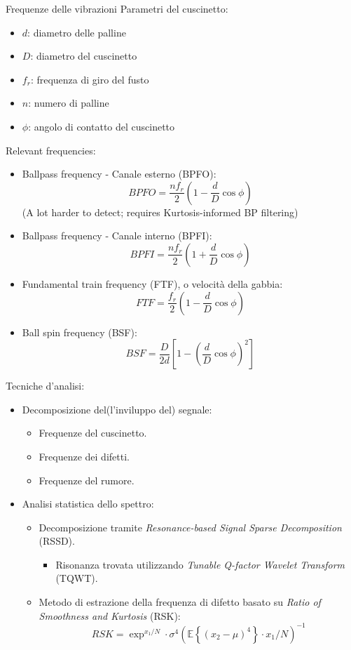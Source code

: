 \documentclass{beamer}
\begin{document}
\begin{frame}[allowframebreaks]{Frequenze delle vibrazioni}
    Parametri del cuscinetto:
    \begin{itemize}
        \item $d$: diametro delle palline
        \item $D$: diametro del cuscinetto
        \item $f_r$: frequenza di giro del fusto
        \item $n$: numero di palline
        \item $\phi$: angolo di contatto del cuscinetto
    \end{itemize}

    Relevant frequencies:
    \begin{itemize}
        \item Ballpass frequency - Canale esterno (BPFO): $$ BPFO = \frac{n f_r}{2} \left( 1 - \frac{d}{D} \cos \phi \right) $$ (A lot harder to detect; requires Kurtosis-informed BP filtering)
        \item Ballpass frequency - Canale interno (BPFI): $$ BPFI = \frac{n f_r}{2} \left( 1 + \frac{d}{D} \cos \phi \right) $$
        \item Fundamental train frequency (FTF), o velocità della gabbia: $$ FTF = \frac{f_r}{2} \left( 1 - \frac{d}{D} \cos \phi \right) $$
        \item Ball spin frequency (BSF): $$ BSF = \frac{D}{2 d} \left[ 1 - \left( \frac{d}{D} \cos \phi \right)^2 \right] $$
    \end{itemize}

    \framebreak
    
    Tecniche d'analisi:
    \begin{itemize}
        \item Decomposizione del(l'inviluppo del) segnale\cite{tang2019fault}:
        \begin{itemize}
            \item Frequenze del cuscinetto.
            \item Frequenze dei difetti.
            \item Frequenze del rumore.
        \end{itemize}
        \item Analisi statistica dello spettro\cite{xue2022fault}:
        \begin{itemize}
            \item Decomposizione tramite \textit{Resonance-based Signal Sparse Decomposition} (RSSD).
            \begin{itemize}
                \item Risonanza trovata utilizzando \textit{Tunable Q-factor Wavelet Transform} (TQWT).
            \end{itemize}
            \item Metodo di estrazione della frequenza di difetto basato su \textit{Ratio of Smoothness and Kurtosis} (RSK): $$RSK = \exp^{x_1/N} \cdot \sigma^4 \left( \mathbb{E}\left\{ (x_2 - \mu)^4 \right\} \cdot x_1 / N \right)^{-1}$$
        \end{itemize}


\end{itemize}
\end{frame}
\end{document}
